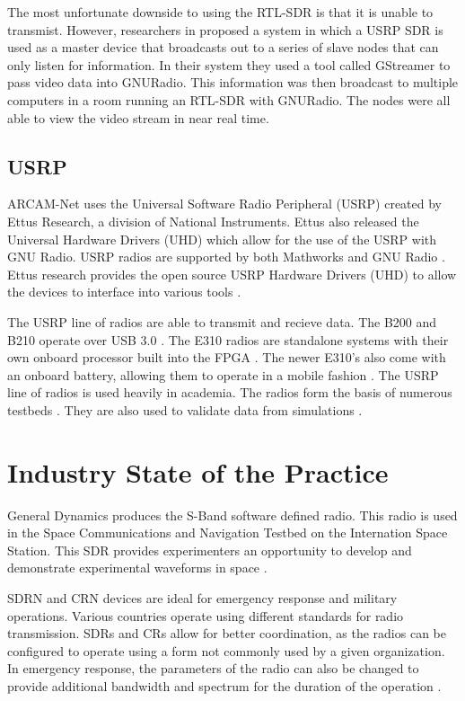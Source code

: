 	The most unfortunate downside to using the RTL-SDR is that it is unable to transmist. However, researchers in \cite{6922233} proposed a system in which a USRP SDR is used as a master device that broadcasts out to a series of slave nodes that can only listen for information. In their system they used a tool called GStreamer to pass video data into GNURadio. This information was then broadcast to multiple computers in a room running an RTL-SDR with GNURadio. The nodes were all able to view the video stream in near real time.  

\subsection{USRP}

ARCAM-Net uses the Universal Software Radio Peripheral (USRP) created by Ettus Research, a division of National Instruments\cite{0006}. Ettus also released the Universal Hardware Drivers (UHD) \cite{0007} which allow for the use of the USRP with GNU Radio. USRP radios are supported by both Mathworks \cite{0027} and GNU Radio \cite{0026}. Ettus research provides the open source USRP Hardware Drivers (UHD) to allow the devices to interface into various tools \cite{0007}.

The USRP line of radios are able to transmit and recieve data. The B200 and B210 operate over USB 3.0 \cite{0034}. The E310 radios are standalone systems with their own onboard processor built into the FPGA \cite{0035}. The newer E310's also come with an onboard battery, allowing them to operate in a mobile fashion \cite{0036}. The USRP line of radios is used heavily in academia. The radios form the basis of numerous testbeds  \cite{4753441} \cite{4212821}. They are also used to validate data from simulations \cite{5508221}. 

\section{Industry State of the Practice}

General Dynamics produces the S-Band software defined radio. This radio is used in the Space Communications and Navigation Testbed on the Internation Space Station. This SDR provides experimenters an opportunity to develop and demonstrate experimental waveforms in space \cite{6497193}. 

SDRN and CRN devices are ideal for emergency response and military operations. Various countries operate using different standards for radio transmission. SDRs and CRs allow for better coordination, as the radios can be configured to operate using a form not commonly used by a given organization. In emergency response, the parameters of the radio can also be changed to provide additional bandwidth and spectrum for the duration of the operation \cite{5639025}. 

